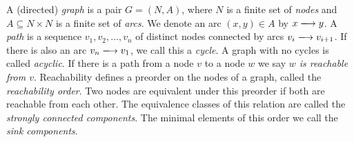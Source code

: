 \documentclass[preprint,authoryear]{elsarticle}
\begin{document}
A (directed) \emph{graph} is a pair $G = (N,A)$, where $N$ is a finite set of \emph{nodes} and $A\subseteq N\times N$ is a finite set of \emph{arcs}. We denote an arc $(x,y)\in A$ by $\arc{x}{y}$. %
A \emph{path} is a sequence $v_1,v_2,\dots,v_n$ of distinct nodes connected by arcs $\arc{v_i}{v_{i+1}}$. If there is also an arc $\arc{v_n}{v_1}$, we call this a \emph{cycle}. A graph with no cycles is called \emph{acyclic}. If there is a path from a node $v$ to a node $w$ we say \emph{$w$ is reachable from $v$}. Reachability defines a preorder on the nodes of a graph, called the \emph{reachability order}. Two nodes are equivalent under this preorder if both are reachable from each other. The equivalence classes of this relation are called the \emph{strongly connected components}. The minimal elements of this order we call the \emph{sink components}. %

 
\end{document}

